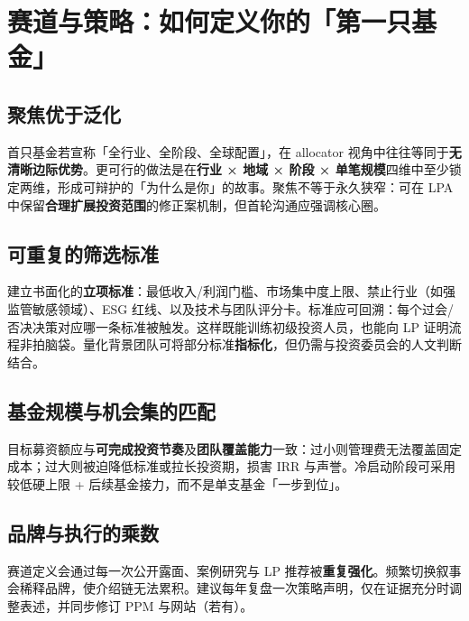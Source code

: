 \chapter{赛道与策略：如何定义你的「第一只基金」}

\section{聚焦优于泛化}

首只基金若宣称「全行业、全阶段、全球配置」，在 allocator 视角中往往等同于\textbf{无清晰边际优势}。更可行的做法是在\textbf{行业 × 地域 × 阶段 × 单笔规模}四维中至少锁定两维，形成可辩护的「为什么是你」的故事。聚焦不等于永久狭窄：可在 LPA 中保留\textbf{合理扩展投资范围}的修正案机制，但首轮沟通应强调核心圈。

\section{可重复的筛选标准}

建立书面化的\textbf{立项标准}：最低收入/利润门槛、市场集中度上限、禁止行业（如强监管敏感领域）、ESG 红线、以及技术与团队评分卡。标准应可回溯：每个过会/否决决策对应哪一条标准被触发。这样既能训练初级投资人员，也能向 LP 证明流程非拍脑袋。量化背景团队可将部分标准\textbf{指标化}，但仍需与投资委员会的人文判断结合。

\section{基金规模与机会集的匹配}

目标募资额应与\textbf{可完成投资节奏}及\textbf{团队覆盖能力}一致：过小则管理费无法覆盖固定成本；过大则被迫降低标准或拉长投资期，损害 IRR 与声誉。冷启动阶段可采用较低硬上限 + 后续基金接力，而不是单支基金「一步到位」。

\section{品牌与执行的乘数}

赛道定义会通过每一次公开露面、案例研究与 LP 推荐被\textbf{重复强化}。频繁切换叙事会稀释品牌，使介绍链无法累积。建议每年复盘一次策略声明，仅在证据充分时调整表述，并同步修订 PPM 与网站（若有）。
